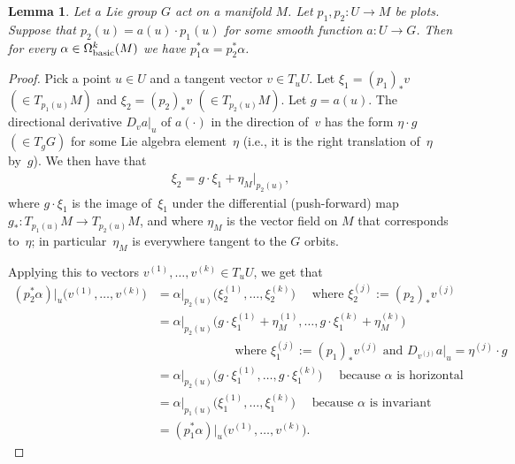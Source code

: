 \documentclass[11pt]{article}
\numberwithin{equation}{section}
\newtheorem{Lemma}[Theorem]{Lemma}
\begin{document}
\begin{Lemma}\label{l:smooth case}
Let a Lie group $G$ act on a manifold $M$.
Let $p_1, p_2 \colon U \to M$ be plots.
Suppose that $p_2(u) = a(u) \cdot p_1(u)$
for some smooth function $a \colon U \to G$.
Then for every $\alpha \in \Omega^k_{\rm basic}(M)$
we have $p_1^*\alpha = p_2^*\alpha$.
\end{Lemma}

\begin{proof}
Pick a point $u \in U$ and a tangent vector $v \in T_uU$.
Let $\xi_1 = (p_1)_*v $ $\left( \in T_{p_1(u)}M \right)$
and $\xi_2 = (p_2)_*v$ $\left( \in T_{p_2(u)}M \right)$.
Let $g = a(u)$.
The directional derivative $D_v a|_u$ of $a(\cdot)$
in the direction of~$v$ has the form $\eta \cdot g$ $\left( \in T_gG \right)$
for some Lie algebra element~$\eta$ (i.e., it is the right translation
of~$\eta$ by~$g$).
We then have that
\begin{gather*} \xi_2 = g \cdot \xi_1 + {\eta_M}|_{p_2(u)}, \end{gather*}
where $g \cdot \xi_1$ is the image of~$\xi_1$
under the dif\/ferential (push-forward) map
$ g_* \colon T_{p_1(u)}M \to T_{p_2(u)}M $,
and where $\eta_M$ is the vector f\/ield on $M$
that corresponds to~$\eta$;
in particular~$\eta_M$ is everywhere tangent to the $G$ orbits.

Applying this to vectors $v^{(1)}, \ldots, v^{(k)} \in T_uU$,
we get that
\begin{align*}
 (p_2^* \alpha)|_u \big( v^{(1)} , \ldots , v^{(k)} \big)
 &= \alpha|_{ p_2(u) } \big( \xi_2^{(1)} , \ldots ,
 \xi_2^{(k)} \big)
 \quad \text{ where } \xi_2^{(j)} := (p_2)_* v^{(j)} \\
 &= \alpha|_{ p_2(u) }
 \big( g \cdot \xi_1^{(1)} + \eta^{(1)}_M , \ldots ,
 g \cdot \xi_1^{(k)} + \eta^{(k)}_M \big) \\
 & \qquad\qquad\qquad \text{ where } \xi_1^{(j)} := (p_1)_* v^{(j)}
 \text{ and }
 D_{v^{(j)}} a|_u = \eta^{(j)} \cdot g \\
 &= \alpha|_{ p_2(u) } \big( g \cdot \xi_1^{(1)} , \ldots ,
 g \cdot \xi_1^{(k)} \big)
 \quad \text{ because $\alpha$ is horizontal } \\
 &= \alpha|_{ p_1(u) } \big( \xi_1^{(1)} , \ldots ,
 \xi_1^{(k)} \big)
 \quad \text{ because $\alpha$ is invariant } \\
 &= (p_1^* \alpha)|_u \big( v^{(1)} , \ldots , v^{(k)} \big).\tag*{\qed}
\end{align*}
 \renewcommand{\qed}{}
\end{proof}
\end{document}
